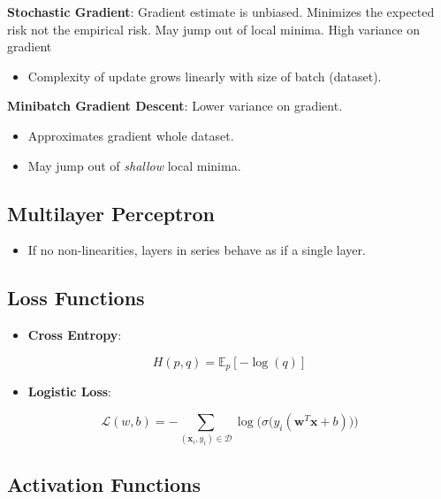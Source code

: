 \documentclass[10pt]{article}
\newcommand{\colortext}[2]{{\color{#1} #2}}
\newcommand{\red}[1]{\colortext{red}{#1}}
\begin{document}
\begin{multicols}{3}
  \textbf{Stochastic Gradient}: Gradient estimate is unbiased. Minimizes the \red{expected risk} not the empirical risk.  May jump out of local minima. High variance on gradient
  \begin{itemize}
    \item Complexity of update grows linearly with size of batch (dataset).
  \end{itemize}

  \textbf{Minibatch Gradient Descent}: Lower variance on gradient.
  \begin{itemize}
    \item Approximates gradient whole dataset.
    \item May jump out of \textit{shallow} local minima.
  \end{itemize}

  \subsection*{Multilayer Perceptron}

  \begin{itemize}
    \item If no non-linearities, layers in series behave as if a single layer.
  \end{itemize}

  \subsection*{Loss Functions}

  \begin{itemize}
    \item \textbf{Cross Entropy}:
  \end{itemize}
  \vspace{-5pt}
  \[ H(p,q) = \mathbb{E}_{p}[-\log(q)] \]
  \begin{itemize}
    \item \textbf{Logistic Loss}:
  \end{itemize}
  \vspace{-5pt}
  \[ \mathcal{L}(w,b) = -\sum_{(\mathbf{x}_i,y_i)\in\mathcal{D}} \log\bigg( \sigma\Big(y_i(\mathbf{w}^T\mathbf{x}+b)\Big)\bigg) \]

  \subsection*{Activation Functions}


\end{multicols}
\end{document}

